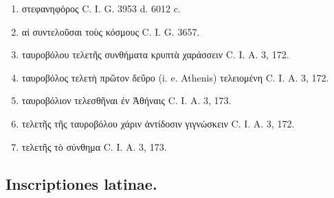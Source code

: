 \documentclass[a4paper, 11pt, oneside, polutonikogreek, german, twocolumn]{article}
\begin{document}
\begin{enumerate}
\item στεφανηφόρος C. I. G. 3953 d. 6012 c.

\item αἱ συντελοῦσαι τοὺς κόσμους C. I. G. 3657.

\item ταυροβόλου τελετῆς συνθήματα κρυπτὰ χαράσσειν C. I. A. 3, 172.

\item ταυροβόλος τελετὴ πρῶτον δεῦρο (i. e. Athenis) τελειομένη C. I. A. 3, 172.

\item ταυροβόλιον τελεσθῆναι ἐν Ἀθήναις C. I. A. 3, 173.

\item τελετῆς τῆς ταυροβόλου χάριν ἀντίδοσιν γιγνώσκειν C. I. A. 3, 172.

\item τελετῆς τὸ σύνθημα C. I. A. 3, 173.
\end{enumerate}
\subsection{Inscriptiones latinae.}
\end{document}
